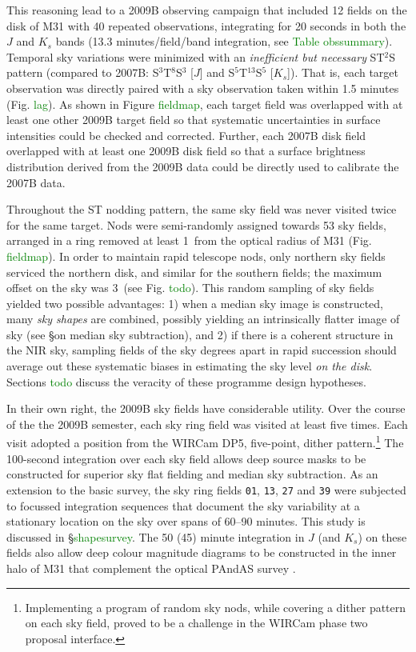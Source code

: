 \documentclass[iop]{emulateapj}
\newcommand{\todo}[1]{\textcolor{green}{#1}}
\begin{document}
This reasoning lead to a 2009B observing campaign that included 12 fields on the disk of M31 with 40 repeated observations, integrating for 20 seconds in both the $J$ and $K_s$ bands (13.3 minutes/field/band integration, see \todo{Table obssummary}). Temporal sky variations were minimized with an \emph{inefficient but necessary} ST$^2$S pattern (compared to 2007B: S$^3$T$^8$S$^3$ [$J$] and S$^5$T$^{13}$S$^5$ [$K_s$]). That is, each target observation was directly paired with a sky observation taken within 1.5 minutes (Fig. \todo{lag}). As shown in Figure \todo{fieldmap}, each target field was overlapped with at least one other 2009B target field so that systematic uncertainties in surface intensities could be checked and corrected. Further, each 2007B disk field overlapped with at least one 2009B disk field so that a surface brightness distribution derived from the 2009B data could be directly used to calibrate the 2007B data.

Throughout the ST nodding pattern, the same sky field was never visited twice for the same target. Nods were semi-randomly assigned towards 53 sky fields, arranged in a ring removed at least 1\arcdeg\ from the optical radius of M31 (Fig. \todo{fieldmap}). In order to maintain rapid telescope nods, only northern sky fields serviced the northern disk, and similar for the southern fields; the maximum offset on the sky was 3\arcdeg\ (see Fig. \todo{todo}). This random sampling of sky fields yielded two possible advantages: 1) when a median sky image is constructed, many \emph{sky shapes} are combined, possibly yielding an intrinsically flatter image of sky (see \S on median sky subtraction), and 2) if there is a coherent structure in the NIR sky, sampling fields of the sky degrees apart in rapid succession should average out these systematic biases in estimating the sky level \emph{on the disk}. Sections \todo{todo} discuss the veracity of these programme design hypotheses.

In their own right, the 2009B sky fields have considerable utility. Over the course of the the 2009B semester, each sky ring field was visited at least five times. Each visit adopted a position from the WIRCam DP5, five-point, dither pattern.\footnote{Implementing a program of random sky nods, while covering a dither pattern on each sky field, proved to be a challenge in the WIRCam phase two proposal interface.} The 100-second integration over each sky field allows deep source masks to be constructed for superior sky flat fielding and median sky subtraction. As an extension to the basic survey, the sky ring fields \texttt{01}, \texttt{13}, \texttt{27} and \texttt{39} were subjected to focussed integration sequences that document the sky variability at a stationary location on the sky over spans of 60--90 minutes. This study is discussed in \S \todo{shapesurvey}. The 50 (45) minute integration in $J$ (and $K_s$) on these fields also allow deep colour magnitude diagrams to be constructed in the inner halo of M31 that complement the optical PAndAS survey \cite{Ibata:2007}.
\end{document}
